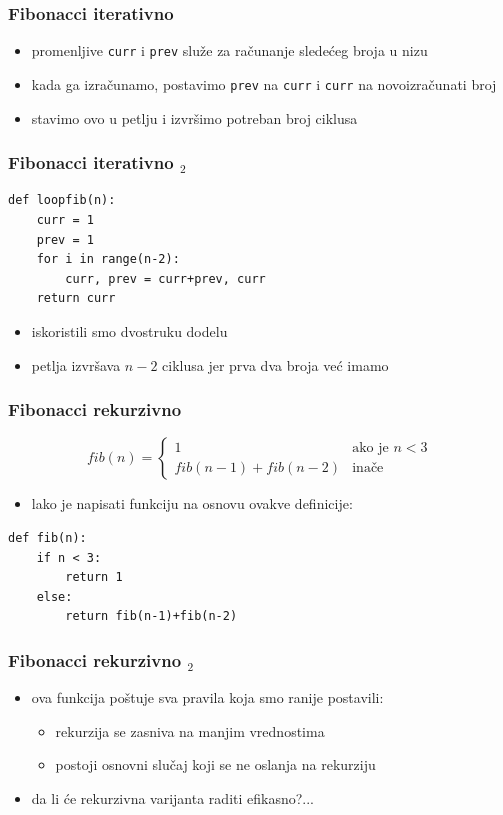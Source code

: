 \documentclass[utf8,compress,aspectratio=169]{beamer}
\begin{document}
\begin{frame}[fragile]
  \frametitle{Fibonacci iterativno}
  \begin{itemize}
    \item promenljive \texttt{curr} i \texttt{prev} služe za računanje sledećeg broja u nizu
    \item kada ga izračunamo, postavimo \texttt{prev} na \texttt{curr} i \texttt{curr} na novoizračunati broj
    \item stavimo ovo u petlju i izvršimo potreban broj ciklusa
  \end{itemize}
\end{frame}

\begin{frame}[fragile]
  \frametitle{Fibonacci iterativno $_2$}
\begin{verbatim}
def loopfib(n):
    curr = 1
    prev = 1
    for i in range(n-2):
        curr, prev = curr+prev, curr
    return curr
\end{verbatim}
  \begin{itemize}
    \item iskoristili smo dvostruku dodelu
    \item petlja izvršava $n-2$ ciklusa jer prva dva broja već imamo
  \end{itemize}
\end{frame}

\begin{frame}[fragile]
  \frametitle{Fibonacci rekurzivno}
$$ fib(n) = \left\{
  \begin{array}{ll}
    1 &\mbox{ako je $n<3$} \\
    fib(n-1)+fib(n-2) &\mbox{ina\v{c}e}
  \end{array}
  \right. $$
  \begin{itemize}
    \item lako je napisati funkciju na osnovu ovakve definicije:
  \end{itemize}
\begin{verbatim}
def fib(n):
    if n < 3:
        return 1
    else:
        return fib(n-1)+fib(n-2)
\end{verbatim}
\end{frame}

\begin{frame}[fragile]
  \frametitle{Fibonacci rekurzivno $_2$}
  \begin{itemize}
    \item ova funkcija poštuje sva pravila koja smo ranije postavili:
  \begin{itemize}
    \item rekurzija se zasniva na manjim vrednostima
    \item postoji osnovni slučaj koji se ne oslanja na rekurziju
  \end{itemize}
    \item da li će rekurzivna varijanta raditi efikasno?...
  \end{itemize}
\end{frame}
\end{document}
